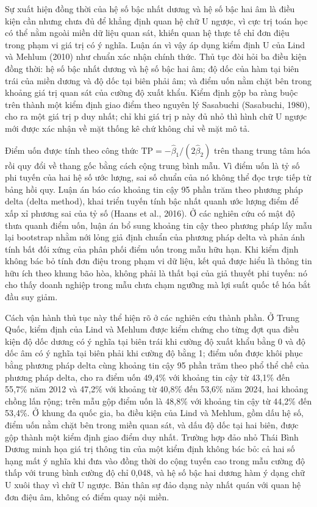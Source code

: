 \documentclass[
  a4paper,
  13pt]{extreport}
\begin{document}
Sự xuất hiện đồng thời của hệ số bậc nhất dương và hệ số bậc hai âm là
điều kiện cần nhưng chưa đủ để khẳng định quan hệ chữ U ngược, vì cực
trị toán học có thể nằm ngoài miền dữ liệu quan sát, khiến quan hệ thực
tế chỉ đơn điệu trong phạm vi giá trị có ý nghĩa. Luận án vì vậy áp dụng
kiểm định U của Lind và Mehlum (2010) như chuẩn xác nhận chính thức. Thủ
tục đòi hỏi ba điều kiện đồng thời: hệ số bậc nhất dương và hệ số bậc
hai âm; độ dốc của hàm tại biên trái của miền dương và độ dốc tại biên
phải âm; và điểm uốn nằm chặt bên trong khoảng giá trị quan sát của
cường độ xuất khẩu. Kiểm định gộp ba ràng buộc trên thành một kiểm định
giao điểm theo nguyên lý Sasabuchi (Sasabuchi, 1980), cho ra một giá trị
p duy nhất; chỉ khi giá trị p này đủ nhỏ thì hình chữ U ngược mới được
xác nhận về mặt thống kê chứ không chỉ về mặt mô tả.

Điểm uốn được tính theo công thức
\(\text{TP} = -\hat\beta_1 / (2\hat\beta_2)\) trên thang trung tâm hóa
rồi quy đổi về thang gốc bằng cách cộng trung bình mẫu. Vì điểm uốn là
tỷ số phi tuyến của hai hệ số ước lượng, sai số chuẩn của nó không thể
đọc trực tiếp từ bảng hồi quy. Luận án báo cáo khoảng tin cậy 95 phần
trăm theo phương pháp delta (delta method), khai triển tuyến tính bậc
nhất quanh ước lượng điểm để xấp xỉ phương sai của tỷ số (Haans et al.,
2016). Ở các nghiên cứu có mật độ thưa quanh điểm uốn, luận án bổ sung
khoảng tin cậy theo phương pháp lấy mẫu lại bootstrap nhằm nới lỏng giả
định chuẩn của phương pháp delta và phản ánh tính bất đối xứng của phân
phối điểm uốn trong mẫu hữu hạn. Khi kiểm định không bác bỏ tính đơn
điệu trong phạm vi dữ liệu, kết quả được hiểu là thông tin hữu ích theo
khung bão hòa, không phải là thất bại của giả thuyết phi tuyến: nó cho
thấy doanh nghiệp trong mẫu chưa chạm ngưỡng mà lợi suất quốc tế hóa bắt
đầu suy giảm.

Cách vận hành thủ tục này thể hiện rõ ở các nghiên cứu thành phần. Ở
Trung Quốc, kiểm định của Lind và Mehlum được kiểm chứng cho từng đợt
qua điều kiện độ dốc dương có ý nghĩa tại biên trái khi cường độ xuất
khẩu bằng 0 và độ dốc âm có ý nghĩa tại biên phải khi cường độ bằng 1;
điểm uốn được khôi phục bằng phương pháp delta cùng khoảng tin cậy 95
phần trăm theo phổ thể chế của phương pháp delta, cho ra điểm uốn 49,4\%
với khoảng tin cậy từ 43,1\% đến 55,7\% năm 2012 và 47,2\% với khoảng từ
40,8\% đến 53,6\% năm 2024, hai khoảng chồng lấn rộng; trên mẫu gộp điểm
uốn là 48,8\% với khoảng tin cậy từ 44,2\% đến 53,4\%. Ở khung đa quốc
gia, ba điều kiện của Lind và Mehlum, gồm dấu hệ số, điểm uốn nằm chặt
bên trong miền quan sát, và dấu độ dốc tại hai biên, được gộp thành một
kiểm định giao điểm duy nhất. Trường hợp đảo nhỏ Thái Bình Dương minh
họa giá trị thông tin của một kiểm định không bác bỏ: cả hai số hạng mất
ý nghĩa khi đưa vào đồng thời do cộng tuyến cao trong mẫu cường độ thấp
với trung bình cường độ chỉ 0,048, và hệ số bậc hai dương hàm ý dạng chữ
U xuôi thay vì chữ U ngược. Bản thân sự đảo dạng này nhất quán với quan
hệ đơn điệu âm, không có điểm quay nội miền.
\end{document}
